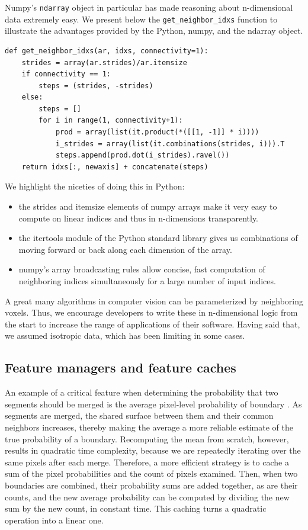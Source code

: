 \documentclass{frontiersSCNS} %
\begin{document}
Numpy's \texttt{\small ndarray} object in particular has made reasoning about n-dimensional data extremely easy.
We present below the \texttt{\small get\_neighbor\_idxs} function to illustrate the advantages provided by the Python, numpy, and the ndarray object.

{\small
\begin{verbatim}
def get_neighbor_idxs(ar, idxs, connectivity=1):
    strides = array(ar.strides)/ar.itemsize
    if connectivity == 1: 
        steps = (strides, -strides)
    else:
        steps = []
        for i in range(1, connectivity+1):
            prod = array(list(it.product(*([[1, -1]] * i))))
            i_strides = array(list(it.combinations(strides, i))).T
            steps.append(prod.dot(i_strides).ravel())
    return idxs[:, newaxis] + concatenate(steps)
\end{verbatim}
}

We highlight the niceties of doing this in Python:
\begin{itemize}
\item the strides and itemsize elements of numpy arrays make it very easy to compute on linear indices and thus in n-dimensions transparently.
\item the itertools module of the Python standard library gives us combinations of moving forward or back along each dimension of the array.
\item numpy's array broadcasting rules allow concise, fast computation of neighboring indices simultaneously for a large number of input indices.
\end{itemize}

A great many algorithms in computer vision can be parameterized by neighboring voxels.
Thus, we encourage developers to write these in n-dimensional logic from the start to increase the range of applications of their software.
Having said that, we assumed isotropic data, which has been limiting in some cases.

\subsection{Feature managers and feature caches}

An example of a critical feature when determining the probability that two segments should be merged is the average pixel-level probability of boundary \citep{Ren:2003jg}.
As segments are merged, the shared surface between them and their common neighbors increases, thereby making the average a more reliable estimate of the true probability of a boundary.
Recomputing the mean from scratch, however, results in quadratic time complexity, because we are repeatedly iterating over the same pixels after each merge.
Therefore, a more efficient strategy is to cache a sum of the pixel probabilities and the count of pixels examined.
Then, when two boundaries are combined, their probability sums are added together, as are their counts, and the new average probability can be computed by dividing the new sum by the new count, in constant time.
This caching turns a quadratic operation into a linear one.
\end{document}
